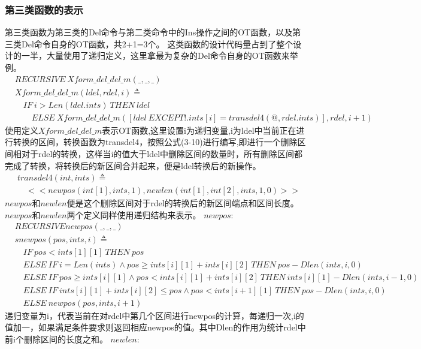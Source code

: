 \subsubsection{第三类函数的表示}
第三类函数为第三类的Del命令与第二类命令中的Ins操作之间的OT函数，以及第三类Del命令自身的OT函数，共2+1=3个。
这类函数的设计代码量占到了整个设计的一半，大量使用了递归定义，这里拿最为复杂的Del命令自身的OT函数来举例。
\begin{align*}
&RECURSIVE\ Xform\_del\_del\_m(\_,\_,\_)\\
&Xform\_del\_del\_m (ldel,rdel,i) \triangleq \\
& \quad IF\ i > Len(ldel.ints)\ THEN\ ldel\\
& \quad \quad  ELSE\ Xform\_del\_del\_m ([ldel\ EXCEPT !.ints[i]= transdel4(@,rdel.ints)],rdel,i+1)
\end{align*}
使用定义$Xform\_del\_del\_m$表示OT函数,这里设置i为递归变量,i为ldel中当前正在进行转换的区间，转换函数为transdel4，按照公式(3-10)进行编写,即进行一个删除区间相对于rdel的转换，这样当i的值大于ldel中删除区间的数量时，所有删除区间都完成了转换，将转换后的新区间合并起来，便是ldel转换后的新操作。
\begin{align*}
&transdel4(int,ints) \triangleq \\ 
  & \quad <<newpos(int[1],ints,1),newlen(int[1],int[2],ints,1,0)   >>
\end{align*}
$newpos$和$newlen$便是这个删除区间对于rdel的转换后的新区间端点和区间长度。
$newpos$和$newlen$两个定义同样使用递归结构来表示。
$newpos$:
\begin{align*}
& RECURSIVE newpos(\_,\_,\_)\\
& snewpos(pos,ints,i) \triangleq\\
&\quad IF \ pos < ints[1][1] \ THEN \ pos\\
&\quad ELSE \ IF \ i=Len(ints) \land pos \ge ints[i][1] + ints[i][2] \ THEN \ pos - Dlen(ints,i,0)\\
&\quad ELSE \ IF \ pos \ge ints[i][1] \land pos < ints[i][1] + ints[i][2] \ THEN \ ints[i][1] - Dlen(ints,i-1,0)\\
&\quad ELSE \ IF \ ints[i][1] + ints[i][2] \le pos \land pos < ints[i+1][1] \ THEN \ pos - Dlen(ints,i,0)\\
&\quad ELSE \ newpos(pos,ints,i+1)
\end{align*}
递归变量为i，代表当前在对rdel中第几个区间进行newpos的计算，每递归一次,i的值加一，如果满足条件要求则返回相应newpos的值。其中Dlen的作用为统计rdel中前i个删除区间的长度之和。
$newlen$:
